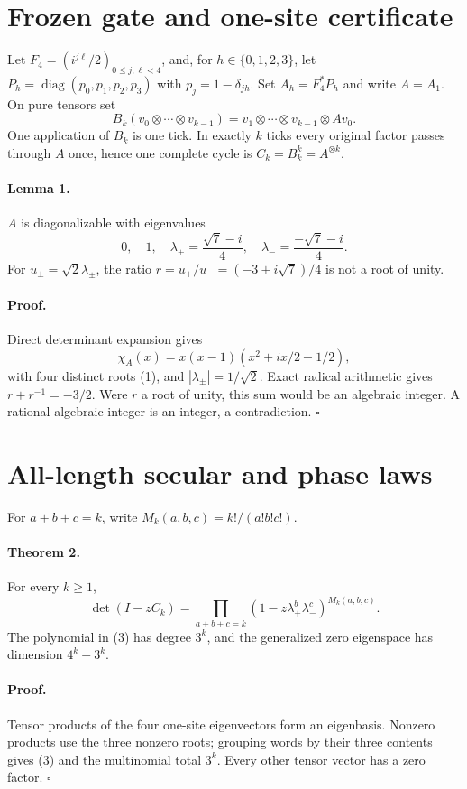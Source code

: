 \documentclass[10pt]{article}
\begin{document}
\section{Frozen gate and one-site certificate}
Let $F_4=(i^{j\ell}/2)_{0\leq j,\ell<4}$,
and, for $h\in\{0,1,2,3\}$, let
$P_h=\operatorname{diag}(p_0,p_1,p_2,p_3)$ with
$p_j=1-\delta_{jh}$.  Set $A_h=F_4^*P_h$ and write $A=A_1$.  On pure
tensors set
\[
 B_k(v_0\otimes\cdots\otimes v_{k-1})
 =v_1\otimes\cdots\otimes v_{k-1}\otimes Av_0.               \tag{T}
\]
One application of $B_k$ is one tick.  In exactly $k$ ticks every original
factor passes through $A$ once, hence one complete cycle is
$C_k=B_k^k=A^{\otimes k}$.

\paragraph{Lemma 1.}
$A$ is diagonalizable with eigenvalues
\[
 0,\quad 1,\quad \lambda_+=\frac{\sqrt7-i}{4},\quad
 \lambda_-=\frac{-\sqrt7-i}{4}.                                \tag{1}
\]
For $u_\pm=\sqrt2\lambda_\pm$, the ratio
$r=u_+/u_-=(-3+i\sqrt7)/4$ is not a root of unity.

\paragraph{Proof.}
Direct determinant expansion gives
\[
 \chi_A(x)=x(x-1)(x^2+ix/2-1/2),                               \tag{2}
\]
with four distinct roots (1), and
$|\lambda_\pm|=1/\sqrt2$.  Exact radical arithmetic gives
$r+r^{-1}=-3/2$.  Were $r$ a root of unity, this sum would be an algebraic
integer.  A rational algebraic integer is an integer, a contradiction.
\hfill$\square$

\section{All-length secular and phase laws}
For $a+b+c=k$, write $M_k(a,b,c)=k!/(a!b!c!)$.

\paragraph{Theorem 2.}
For every $k\geq1$,
\[
 \det(I-zC_k)=\prod_{a+b+c=k}
 (1-z\lambda_+^b\lambda_-^c)^{M_k(a,b,c)}.                     \tag{3}
\]
The polynomial in (3) has degree $3^k$, and the generalized zero eigenspace
has dimension $4^k-3^k$.

\paragraph{Proof.}
Tensor products of the four one-site eigenvectors form an eigenbasis.
Nonzero products use the three nonzero roots; grouping words by their three
contents gives (3) and the multinomial total $3^k$.  Every other tensor
vector has a zero factor. \hfill$\square$
\end{document}
